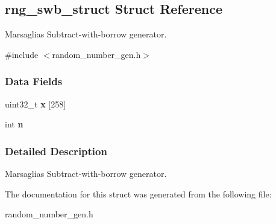 \hypertarget{structrng__swb__struct}{}\subsection{rng\+\_\+swb\+\_\+struct Struct Reference}
\label{structrng__swb__struct}


Marsaglia\textquotesingle{}s Subtract-\/with-\/borrow generator.  




{\ttfamily \#include $<$random\+\_\+number\+\_\+gen.\+h$>$}

\subsubsection*{Data Fields}
\begin{DoxyCompactItemize}
\item 
\mbox{\label{structrng__swb__struct_a234533129437be2de5fb9b6b45fba837}} 
uint32\+\_\+t {\bfseries x} \mbox{[}258\mbox{]}
\item 
\mbox{\label{structrng__swb__struct_a5e74e2b305ae34ff47e9f78e5802f75a}} 
int {\bfseries n}
\end{DoxyCompactItemize}


\subsubsection{Detailed Description}
Marsaglia\textquotesingle{}s Subtract-\/with-\/borrow generator. 

The documentation for this struct was generated from the following file\+:\begin{DoxyCompactItemize}
\item 
random\+\_\+number\+\_\+gen.\+h\end{DoxyCompactItemize}

